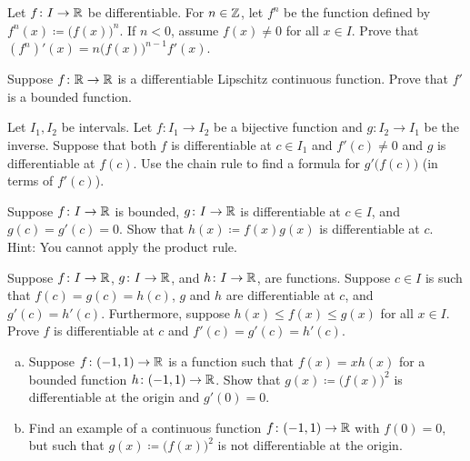 \begin{exercise}
Let $f \colon I \to {\mathbb{R}}$ be differentiable.  For $n \in {\mathbb{Z}}$, let $f^n$
be the function defined by $f^n(x) \coloneqq {\bigl( f(x) \bigr)}^n$.  If
$n < 0$, assume $f(x) \neq 0$ for all $x \in I$.  Prove that
$(f^n)'(x) = n {\bigl(f(x) \bigr)}^{n-1} f'(x)$.
\end{exercise}

\begin{exercise}
Suppose $f \colon {\mathbb{R}} \to {\mathbb{R}}$ is a differentiable
Lipschitz continuous function.
Prove that $f'$ is a bounded function.
\end{exercise}

\begin{exercise} \label{exercise:inversederformula}
Let $I_1, I_2$ be intervals.
Let $f \colon I_1 \to I_2$ be a bijective function and $g \colon I_2 \to I_1$
be the inverse.  Suppose that both $f$ is differentiable at $c \in I_1$ and
$f'(c) \neq 0$ and $g$ is differentiable at $f(c)$.  Use the chain rule
to find a formula for $g'\bigl(f(c)\bigr)$ (in terms of $f'(c)$).
\end{exercise}

\begin{exercise} \label{exercise:bndmuldiff}
Suppose $f \colon I \to {\mathbb{R}}$ is bounded, $g \colon I \to
{\mathbb{R}}$ is differentiable at $c \in I$, and $g(c) = g'(c) = 0$.  Show
that $h(x) \coloneqq f(x) g(x)$ is differentiable at $c$.  Hint: You
cannot apply the product rule.
\end{exercise}

\begin{exercise} \label{exercise:diffsqueeze}
Suppose $f \colon I \to {\mathbb{R}}$, 
$g \colon I \to {\mathbb{R}}$, and
$h \colon I \to {\mathbb{R}}$, are functions.  Suppose $c \in I$ is such that
$f(c) = g(c) = h(c)$, $g$ and $h$ are differentiable at $c$,
and $g'(c) = h'(c)$.  Furthermore, suppose $h(x) \leq f(x) \leq g(x)$ for
all $x \in I$.  Prove $f$ is differentiable at $c$ and $f'(c) = g'(c) =
h'(c)$.
\end{exercise}

\begin{exercise}
\leavevmode
\begin{enumerate}[a)]
\item
Suppose $f \colon (-1,1) \to {\mathbb{R}}$ is a function such that $f(x) = x h(x)$ for
a bounded function $h \colon (-1,1) \to {\mathbb{R}}$.
Show that $g(x) \coloneqq {\bigl( f(x) \bigr)}^2$ is
differentiable at the origin and $g'(0) = 0$.
\item
Find an example of a
continuous function $f \colon (-1,1) \to {\mathbb{R}}$ with $f(0) = 0$, but such
that $g(x) \coloneqq {\bigl( f(x) \bigr)}^2$ is not differentiable at the origin.
\end{enumerate}
\end{exercise}

